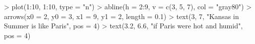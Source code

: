 \begin{Schunk}
\begin{Sinput}
> plot(1:10, 1:10, type = "n")
> abline(h = 2:9, v = c(3, 5, 7), col = "gray80")
> arrows(x0 = 2, y0 = 3, x1 = 9, y1 = 2, length = 0.1)
> text(3, 7, "Kansas in Summer is like Paris", pos = 4)
> text(3.2, 6.6, "if Paris were hot and humid", pos = 4)
\end{Sinput}
\end{Schunk}
